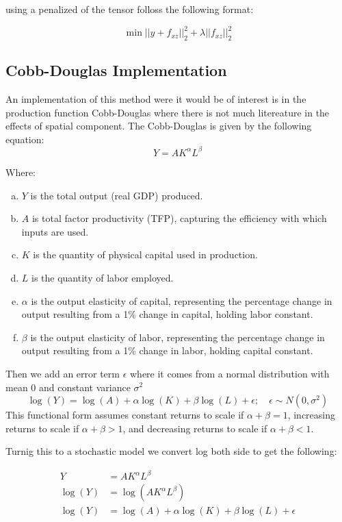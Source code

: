 \documentclass{article}
\begin{document}
using a penalized of the tensor folloss the following format:

$$
	\min{||y+ f_{xz}||^2_2 + \lambda ||f_{xz}||^2_2}
$$


\subsection{Cobb-Douglas Implementation}

An implementation of this method were it would be of interest is in the production function Cobb-Douglas where there is not much litereature in the effects of spatial
component. The Cobb-Douglas is given by the following equation:
$$
	Y = A K^\alpha L^\beta
$$

Where:
\begin{enumerate}[(a)]
	\item $Y$ is the total output (real GDP) produced.
	\item $A$ is total factor productivity (TFP), capturing the efficiency with which inputs are used.
	\item $K$ is the quantity of physical capital used in production.
	\item $L$ is the quantity of labor employed.
	\item $\alpha$ is the output elasticity of capital, representing the percentage change in output resulting from a 1\% change in capital, holding labor constant.
	\item $\beta$ is the output elasticity of labor, representing the percentage change in output resulting from a 1\% change in labor, holding capital constant.
\end{enumerate}


Then we add an error term $\epsilon$ where it comes from a normal distribution with mean $0$ and constant variance $\sigma^2$
\begin{equation}
	\log(Y)   = \log(A) + \alpha \log(K) + \beta \log(L) +\epsilon ; \quad \epsilon \sim N(0,\sigma^2)
\end{equation}
This functional form assumes constant returns to scale if $\alpha + \beta = 1$, increasing returns to scale if $\alpha + \beta > 1$, and decreasing returns to scale if $\alpha + \beta < 1$.

Turnig this to a stochastic model we convert log both side to get the following:

\[
	\begin{split}
		Y         & = A K^\alpha L^\beta                                  \\
		\log{(Y)} & = \log{(A K^\alpha L^\beta)}                          \\
		\log(Y)   & = \log(A) + \alpha \log(K) + \beta \log(L) + \epsilon
	\end{split}
\]
\end{document}
